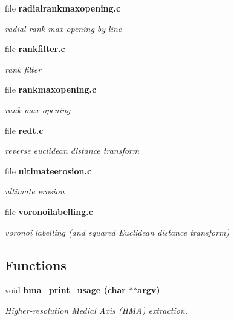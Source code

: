 \begin{CompactItemize}
\item 
file \bf{radialrankmaxopening.c}
\begin{CompactList}\small\item\em radial rank-max opening by line \item\end{CompactList}

\item 
file \bf{rankfilter.c}
\begin{CompactList}\small\item\em rank filter \item\end{CompactList}

\item 
file \bf{rankmaxopening.c}
\begin{CompactList}\small\item\em rank-max opening \item\end{CompactList}

\item 
file \bf{redt.c}
\begin{CompactList}\small\item\em reverse euclidean distance transform \item\end{CompactList}

\item 
file \bf{ultimateerosion.c}
\begin{CompactList}\small\item\em ultimate erosion \item\end{CompactList}

\item 
file \bf{voronoilabelling.c}
\begin{CompactList}\small\item\em voronoi labelling (and squared Euclidean distance transform) \item\end{CompactList}

\end{CompactItemize}
\subsection*{Functions}
\begin{CompactItemize}
\item 
void \bf{hma\_\-print\_\-usage} (char $\ast$$\ast$argv)
\begin{CompactList}\small\item\em Higher-resolution Medial Axis (HMA) extraction. \item\end{CompactList}\end{CompactItemize}


